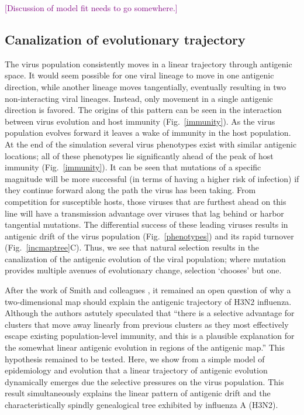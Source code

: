 \documentclass[11pt,oneside,letterpaper]{article}
\def\tbc#1{\textcolor{purple}{[#1]}}
\begin{document}
\tbc{Discussion of model fit needs to go somewhere.}

\subsection*{Canalization of evolutionary trajectory}

The virus population consistently moves in a linear trajectory through antigenic space.  It would seem possible for one viral lineage to move in one antigenic direction, while another lineage moves tangentially, eventually resulting in two non-interacting viral lineages.  Instead, only movement in a single antigenic direction is favored.  The origins of this pattern can be seen in the interaction between virus evolution and host immunity (Fig.~\ref{immunity}).  As the virus population evolves forward it leaves a wake of immunity in the host population.  At the end of the simulation several virus phenotypes exist with similar antigenic locations; all of these phenotypes lie significantly ahead of the peak of host immunity (Fig.~\ref{immunity}).  It can be seen that mutations of a specific magnitude will be more successful (in terms of having a higher risk of infection) if they continue forward along the path the virus has been taking.  From competition for susceptible hosts, those viruses that are furthest ahead on this line will have a transmission advantage over viruses that lag behind or harbor tangential mutations.  The differential success of these leading viruses results in antigenic drift of the virus population (Fig.~\ref{phenotypes}) and its rapid turnover (Fig.~\ref{incmaptree}C).  Thus, we see that natural selection results in the canalization of the antigenic evolution of the viral population; where mutation provides multiple avenues of evolutionary change, selection `chooses' but one.

After the work of Smith and colleagues \cite{Smith04}, it remained an open question of why a two-dimensional map should explain the antigenic trajectory of H3N2 influenza.  Although the authors astutely speculated that ``there is a selective advantage for clusters that move away linearly from previous clusters as they most effectively escape existing population-level immunity, and this is a plausible explanation for the somewhat linear antigenic evolution in regions of the antigenic map.''  This hypothesis remained to be tested.  Here, we show from a simple model of epidemiology and evolution that a linear trajectory of antigenic evolution dynamically emerges due the selective pressures on the virus population.  This result simultaneously explains the linear pattern of antigenic drift \cite{Smith04} and the characteristically spindly genealogical tree \cite{Fitch97} exhibited by influenza A (H3N2).
\end{document}
